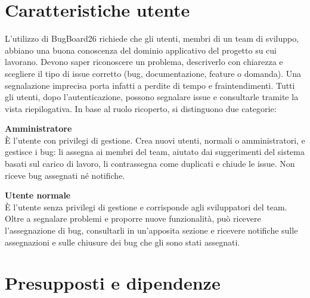 \clearpage

\section{Caratteristiche utente}
L'utilizzo di BugBoard26 richiede che gli utenti, membri di un team di sviluppo, abbiano una buona conoscenza del dominio applicativo del progetto su cui lavorano. Devono saper riconoscere un problema, descriverlo con chiarezza e scegliere il tipo di issue corretto (bug, documentazione, feature o domanda). Una segnalazione imprecisa porta infatti a perdite di tempo e fraintendimenti.
Tutti gli utenti, dopo l'autenticazione, possono segnalare issue e consultarle tramite la vista riepilogativa. In base al ruolo ricoperto, si distinguono due categorie:

\textbf{Amministratore}\\
È l'utente con privilegi di gestione. Crea nuovi utenti, normali o amministratori, e gestisce i bug: li assegna ai membri del team, aiutato dai suggerimenti del sistema basati sul carico di lavoro, li contrassegna come duplicati e chiude le issue. Non riceve bug assegnati né notifiche.

\textbf{Utente normale}\\
È l'utente senza privilegi di gestione e corrisponde agli sviluppatori del team. Oltre a segnalare problemi e proporre nuove funzionalità, può ricevere l'assegnazione di bug, consultarli in un'apposita sezione e ricevere notifiche sulle assegnazioni e sulle chiusure dei bug che gli sono stati assegnati.

\section{Presupposti e dipendenze}

